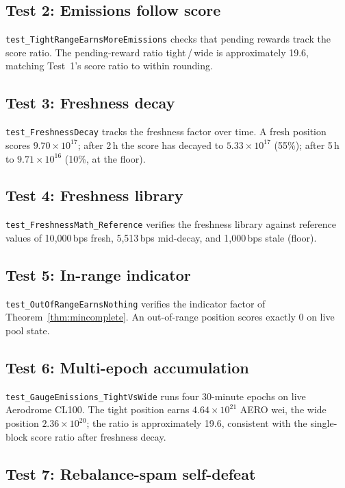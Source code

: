 \documentclass[11pt,a4paper]{article}
\theoremstyle{definition}
\theoremstyle{plain}
\theoremstyle{remark}
\begin{document}
\subsection*{Test 2: Emissions follow score}\label{app:test2}

\texttt{test\_TightRangeEarnsMoreEmissions} checks that pending rewards track the score ratio. The pending-reward ratio tight\,/\,wide is approximately 19.6, matching Test~1's score ratio to within rounding.

\subsection*{Test 3: Freshness decay}\label{app:test3}

\texttt{test\_FreshnessDecay} tracks the freshness factor over time. A fresh position scores $9.70 \times 10^{17}$; after 2\,h the score has decayed to $5.33 \times 10^{17}$ (55\%); after 5\,h to $9.71 \times 10^{16}$ (10\%, at the floor).

\subsection*{Test 4: Freshness library}\label{app:test4}

\texttt{test\_FreshnessMath\_Reference} verifies the freshness library against reference values of 10{,}000\,bps fresh, 5{,}513\,bps mid-decay, and 1{,}000\,bps stale (floor).

\subsection*{Test 5: In-range indicator}\label{app:test5}

\texttt{test\_OutOfRangeEarnsNothing} verifies the indicator factor of Theorem~\ref{thm:mincomplete}. An out-of-range position scores exactly 0 on live pool state.

\subsection*{Test 6: Multi-epoch accumulation}\label{app:test6}

\texttt{test\_GaugeEmissions\_TightVsWide} runs four 30-minute epochs on live Aerodrome CL100. The tight position earns $4.64 \times 10^{21}$ AERO wei, the wide position $2.36 \times 10^{20}$; the ratio is approximately 19.6, consistent with the single-block score ratio after freshness decay.

\subsection*{Test 7: Rebalance-spam self-defeat}\label{app:test7}
\end{document}
